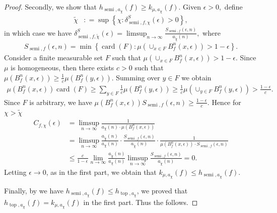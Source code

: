 \documentclass[10pt,a4paper]{amsart}
\DeclareMathOperator{\card}{card}
\newcommand{\dfn}{\mathrel{\mathop:}=}
\newcommand{\e}{\epsilon}
\newcommand{\semitop}{\operatorname{semi}} %
\newcommand{\topo}{\operatorname{top}}
\begin{document}
\begin{proof}
Secondly, we show that $h_{\semitop, a_{\chi }} (f) \ge k_{\mu , a_{\chi }} (f).$ Given $\e >0,$  define 
  \begin{align*}
    \tilde{\chi }
    &\dfn \sup \left\{ \chi  : \delta_{\semitop,f,\chi} ^S (\e)  >0  \right\},
  \end{align*} 
  in which case we have $\displaystyle  \delta_{\semitop,f,\tilde{\chi }}^S (\e)  = \limsup _{n \to \infty } \frac{S_{\semitop,f} (\e , n)}{a_{\tilde{\chi }}(n)},$ where 
  \begin{align*}
    S_{\semitop,f} (\e ,n) = \min \left\{ \card (F) : \mu \left( \cup_{x \in F} B^n_f (x,\e ) \right) > 1- \e   \right\}.
  \end{align*} 
  Consider a finite measurable set $F$ such that $\mu \left( \cup_{x \in F} B^n_f (x,\e ) \right) > 1- \e .$
  Since $\mu $ is homogeneous, then there exists $c>0$  such that $\mu \left( B^n_f (x,\e ) \right) \ge \frac{1}{c} \mu \left( B^n_f (y,\e ) \right). $    Summing over $y \in F $ we obtain 
  \begin{align*}
    \mu \left( B^n_f (x,\e ) \right) \card (F)
    \ge \sum_{y \in F} \frac{1}{c} \mu \left( B^n_f (y,\e ) \right) 
    \ge \frac{1}{c} \mu \left( \cup_{y \in F}  B^n_f (y,\e )\right)  
    > \frac{1-\e }{c}.
  \end{align*} 
  Since $F$ is arbitrary, we have $\mu \left( B^n_f (x,\e ) \right) S_{\semitop,f} (\e ,n) \ge \frac{1-\e }{c} .$ Hence for $\chi > \tilde{\chi }$ 
  \begin{align*}
    C_{f, \chi} (\e ) 
    &= \limsup _{n \to \infty } \frac{1}{a_{\chi }(n) \cdot \mu \left( B^n_f (x, \e ) \right) }
    \\ 
    &= \limsup _{n \to \infty } \frac{a_{\tilde{\chi }} (n)}{a_{\chi }(n)} \cdot \frac{S_{\semitop,f} (\e , n)}{a_{\tilde{\chi }}(n)} \cdot  \frac{1}{ \mu \left( B^n_f (x, \e ) \right) \cdot S_{\semitop,f} (\e , n) } 
    \\ 
    & \le \frac{c}{1-\e }  \lim_{n \to \infty} \frac{a_{\tilde{\chi }} (n)}{a_{\chi }(n)} \limsup_{n \to \infty } \frac{S_{\semitop,f} (\e , n)}{a_{\tilde{\chi }}(n)} = 0.
  \end{align*}
  Letting $\e \to 0$, as in the first part, we obtain that  
  $k_{\mu ,a_{\chi }} (f) \le h_{\semitop, a_{\chi }} (f).$ 
   
  Finally, 
  by  
  we have $h_{\semitop, a_{\chi}} (f) \le h_{\topo, a_{\chi}}$, we proved that $h_{\topo,a_{\chi}} (f) = k_{\mu, a_{\chi}} (f)$ in the first part. Thus the  follows.
\end{proof}
\end{document}
